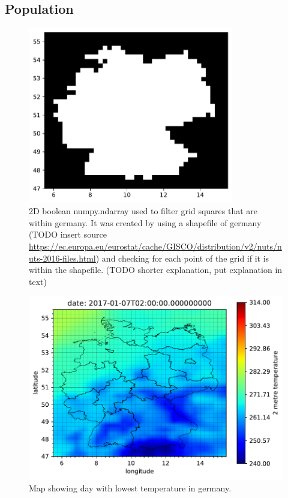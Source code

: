 \subsection{Population}



\begin{figure}[h!]%
\centering
\includegraphics[width=0.8\textwidth]{plots/isin}%
\caption{2D boolean numpy.ndarray used to filter grid squares that are within germany. It was created by using a shapefile of germany (TODO insert source \url{https://ec.europa.eu/eurostat/cache/GISCO/distribution/v2/nuts/nuts-2016-files.html}) and checking for each point of the grid if it is within the shapefile. (TODO shorter explanation, put explanation in text)}%
\label{fig:isin}%
\end{figure}

\begin{figure}[h!]%
\centering
\includegraphics[width=\textwidth]{plots/0_2017010702_20190617161317}%
\caption{Map showing day with lowest temperature in germany.}%
\label{fig:0_2017010702_20190617161317}%
\end{figure}

